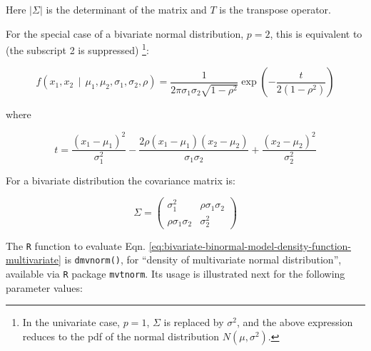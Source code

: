 \documentclass[
]{book}
\begin{document}
Here \(|\Sigma|\) is the determinant of the matrix and \(T\) is the transpose operator.

For the special case of a bivariate normal distribution, \(p = 2\), this is equivalent to (the subscript 2 is suppressed) \footnote{In the univariate case, \(p = 1\), \(\Sigma\) is replaced by \(\sigma^2\), and the above expression reduces to the pdf of the normal distribution \(N(\mu, \sigma^2)\).}:

\begin{equation} 
f\left( x_1,x_2 ~~ \bigg \rvert ~~ \mu_1, \mu_2,  \sigma_1, \sigma_2, \rho \right)
= \frac{1}{2 \pi \sigma_1 \sigma_2 \sqrt{1-\rho^2}}\exp\left( -\frac{t}{2\left( 1-\rho^2 \right)} \right)
\label{eq:bivariate-binormal-model-density-function}
\end{equation}

where

\begin{equation} 
t=\frac{\left( x_1-\mu_1 \right)^2}{\sigma_1^2}-\frac{2\rho\left( x_1-\mu_1 \right)\left( x_2-\mu_2 \right)}{\sigma_1 \sigma_2}
+\frac{\left( x_2-\mu_2 \right)^2}{\sigma_2^2}
\label{eq:bivariate-binormal-model-density-function2}
\end{equation}

For a bivariate distribution the covariance matrix is:

\begin{equation} 
\Sigma=
\left( \begin{matrix}
\sigma_1^2 & \rho \sigma_1 \sigma_2 \\
\rho \sigma_1 \sigma_2 & 
\sigma_2^2
\end{matrix}
 \right)\label{eq:bivariate-binormal-model-covariance-matrix}
\end{equation}

The \texttt{R} function to evaluate Eqn. \eqref{eq:bivariate-binormal-model-density-function-multivariate} is \texttt{dmvnorm()}, for ``density of multivariate normal distribution'', available via \texttt{R} package \texttt{mvtnorm}. Its usage is illustrated next for the following parameter values:
\end{document}
